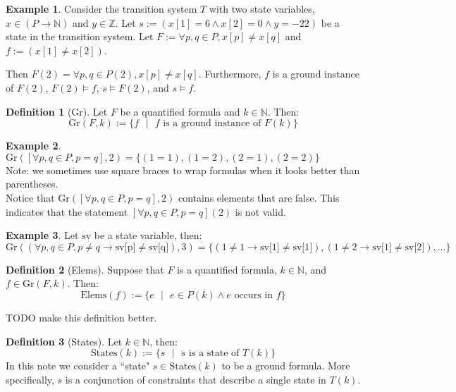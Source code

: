 \documentclass[12pt]{article}
\theoremstyle{definition}
\newtheorem{definition}{Definition}
\newtheorem{example}{Example}
\theoremstyle{remark}
\newcommand{\st}{\text{ }|\text{ }}
\newcommand{\states}{\text{States}}
\newcommand{\gr}{\text{Gr}}
\newcommand{\elems}{\text{Elems}}
\begin{document}
\begin{example}
  Consider the transition system $T$ with two state variables, $x \in (P \to \mathbb{N})$ and $y \in \mathbb{Z}$.  Let $s := (x[1]=6 \land x[2]=0 \land y=-22)$ be a state in the transition system.  Let $F := \forall p,q \in P, x[p] \neq x[q]$ and $f := (x[1] \neq x[2])$.

  Then $F(2) = \forall p,q \in P(2), x[p] \neq x[q]$.  Furthermore, $f$ is a ground instance of $F(2)$, $F(2) \models f$, $s \models F(2)$, and $s \models f$.
\end{example}

\begin{definition}[Gr]
  Let $F$ be a quantified formula and $k \in \mathbb{N}$.  Then:
  $$\gr(F,k) := \{f \st f \text{ is a ground instance of } F(k)\}$$
\end{definition}

\begin{example}
  $\gr([\forall p,q \in P, p=q],2) = \{(1=1),(1=2),(2=1),(2=2)\}$\\
  Note: we sometimes use square braces to wrap formulas when it looks better than parentheses.\\
  Notice that $\gr([\forall p,q \in P, p=q],2)$ contains elements that are false.  This indicates that the statement $[\forall p,q \in P, p=q](2)$ is not valid.
\end{example}
\begin{example}
  Let $\text{sv}$ be a state variable, then:
  $$\gr((\forall p,q \in P, p \neq q \rightarrow \text{sv[p]} \neq \text{sv[q]}),3) = \{(1 \neq 1 \rightarrow \text{sv[1]} \neq \text{sv[1]}),(1 \neq 2 \rightarrow \text{sv[1]} \neq \text{sv[2]}),...\}$$
\end{example}

\begin{definition}[Elems]
  Suppose that $F$ is a quantified formula, $k \in \mathbb{N}$, and $f \in \gr(F,k)$.  Then:
  $$\elems(f) := \{e \st e \in P(k) \land e \text{ occurs in } f\}$$

  TODO make this definition better.
\end{definition}

\begin{definition}[States]
  Let $k \in \mathbb{N}$, then:
  $$\states(k) := \{s \st s \text{ is a state of } T(k)\}$$
  In this note we consider a ``state" $s \in \states(k)$ to be a ground formula.  More specifically, $s$ is a conjunction of constraints that describe a single state in $T(k)$.
\end{definition}
\end{document}
